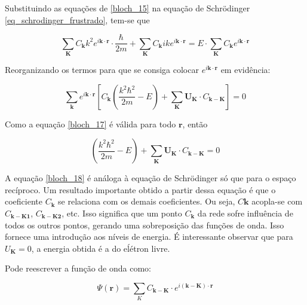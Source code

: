 	Substituindo as equações de \eqref{bloch_15} na equação de Schrödinger \eqref{eq_schrodinger_frustrado}, tem-se que

	\begin{equation}
		\label{bloch_16}
		\sum_{\mathbf{K}} C_{\mathbf{k}} k^2 e^{i\mathbf{k}\cdot \mathbf{r}} \cdot \frac{\hbar}{2m}
			+ \sum_{\mathbf{K}} C_{\mathbf{k}} ik e^{i\mathbf{k}\cdot \mathbf{r}}
			= E \cdot \sum_{\mathbf{K}} C_{\mathbf{k}} e^{i\mathbf{k}\cdot \mathbf{r}}
	\end{equation}

	Reorganizando os termos para que se consiga colocar $e^{i\mathbf{k}\cdot \mathbf{r}}$ em evidência:

	\begin{equation}
		\label{bloch_17}
		\sum_{\mathbf{k}} e^{i\mathbf{k}\cdot \mathbf{r}}
			\left[ 
				C_\mathbf{k} \left( \frac{k^2 \hbar^2}{2m} - E \right)
				+ \sum_{\mathbf{K}} \mathbf{U}_{\mathbf{K}} \cdot C_{\mathbf{k-K}}
		   \right] = 0
	\end{equation}

	Como a equação \eqref{bloch_17} é válida para todo $\mathbf{r}$, então

	\begin{equation}
		\label{bloch_18}
		\left( \frac{k^2 \hbar^2}{2m} - E \right)
				+ \sum_{\mathbf{K}} \mathbf{U}_{\mathbf{K}} \cdot C_{\mathbf{k-K}} = 0
	\end{equation}

	\par A equação \eqref{bloch_18} é análoga à equação de Schrödinger só que para o espaço recíproco\cite{qm_fis2}. Um resultado importante obtido a partir dessa equação é que o coeficiente $C_{\mathbf{k}}$ se relaciona com os demais coeficientes\cite{qm_fis5}. Ou seja, $C\mathbf{k}$ acopla-se com $C_{\mathbf{k-K1}}$, $C_{\mathbf{k-K2}}$, etc. Isso significa que um ponto $C_{\mathbf{k}}$ da rede sofre influência de todos os outros pontos, gerando uma sobreposição das funções de onda. Isso fornece uma introdução aos níveis de energia\cite{bloch2}. É interessante observar que para $U_{\mathbf{K}} = 0$, a energia obtida é a do eĺétron livre.

	\par Pode reescrever a função de onda como:

	\begin{equation}
		\label{bloch_19}
		\Psi (\mathbf{r}) = \sum_{K} C_{\mathbf{k-K}}\cdot e^{i\mathbf{(k-K)}\cdot\mathbf{r}}
	\end{equation}

